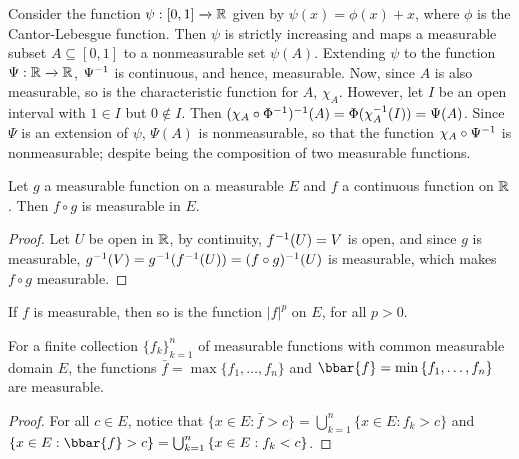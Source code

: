 \begin{example}\label{example_3.2}
    Consider the function $\psi:[0,1] \xrightarrow{} \mathbb{R}$ given by
    $\psi(x)=\phi(x)+x$, where $\phi$ is the Cantor-Lebesgue function. Then
    $\psi$ is strictly increasing and maps a measurable subset  $A \subseteq
    [0,1]$ to a nonmeasurable set $\psi(A)$. Extending $\psi$ to the function
    $\Psi:\mathbb{R} \xrightarrow{} \mathbb{R}$, $\Psi^{-1}$ is continuous, and hence,
    measurable. Now, since $A$ is also measurable, so is the characteristic
    function for  $A$,  $\chi_A$. However, let $I$ be an open interval with  $1
    \in I$ but  $0 \notin I$. Then $(\chi_A \circ
    \Phi^{-1})^{-1}(A)=\Phi(\chi_A^{-1}(I))=\Psi(A)$. Since $\Psi$ is an extension
    of  $\psi$,  $\Psi(A)$ is nonmeasurable, so that the function $\chi_A \circ
    \Psi^{-1}$ is nonmeasurable; despite being the composition of two
    measurable functions.
\end{example}

\begin{lemma}\label{3.1.6}
    Let $g$ a measurable function on a measurable $E$ and  $f$ a continuous
    function on $\mathbb{R}$. Then  $f \circ g$ is measurable in  $E$.
\end{lemma}
\begin{proof}
    Let $U$ be open in  $\mathbb{R}$, by continuity,  $f^{-1}(U)=V$ is open, and since
    $g$ is measurable,  $g^{-1}(V)=g^{-1}(f^{-1}(U))=(f \circ g)^{-1}(U)$ is
    measurable, which makes $f \circ g$ measurable.
\end{proof}
\begin{corollary}
    If $f$ is measurable, then so is the function  $|f|^p$ on $E$, for all
    $p>0$.
\end{corollary}

\begin{lemma}\label{3.1.7}
    For a finite collection $\{f_k\}_{k=1}^n$ of measurable functions with
    common measurable domain $E$, the functions  $\bar{f}=\max{\{f_1, \dots,
    f_n\}}$ and $\bbar{f}=\min{\{f_1, \dots, f_n\}}$ are measurable.
\end{lemma}
\begin{proof}
    For all $c \in E$, notice that  $\{x \in E : \bar{f}>c\}=\bigcup_{k=1}^n{\{x
    \in E : f_k>c\}}$ and $\{x \in E : \bbar{f}>c\}=\bigcup_{k=1}^n{\{x
    \in E : f_k<c\}}$.
\end{proof}
